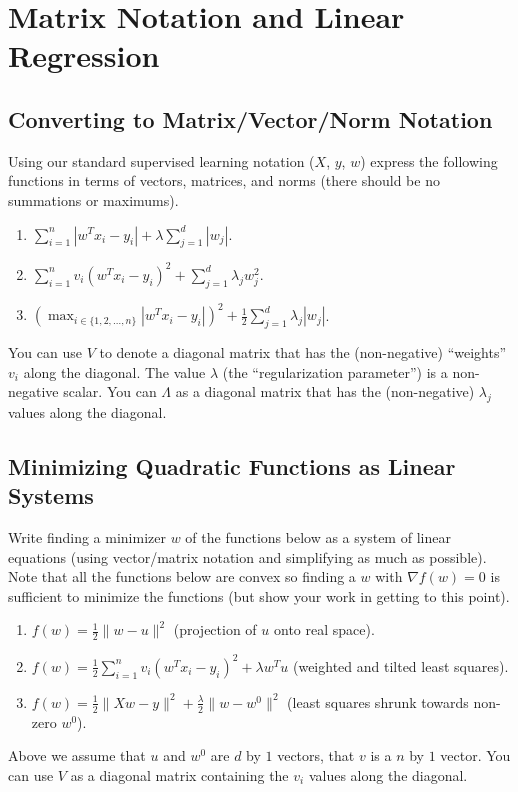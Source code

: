 \documentclass{article}
\def\blu#1{{\color{blu}#1}}
\def\norm#1{\|#1\|}
\def\half{\frac 1 2}
\def\enum#1{\begin{enumerate}#1\end{enumerate}}
\begin{document}
\section{Matrix Notation and Linear Regression}

\subsection{Converting to Matrix/Vector/Norm Notation}

Using our standard supervised learning notation ($X$, $y$, $w$)
express the following functions in terms of vectors, matrices, and norms (there should be no summations or maximums).
\blu{\enum{
\item $\sum_{i=1}^n  |w^Tx_i - y_i| + \lambda \sum_{j=1}^{d} |w_j|$.
\item $\sum_{i=1}^n v_i (w^Tx_i - y_i)^2 + \sum_{j=1}^{d} \lambda_j w_j^2$.
\item $\left(\max_{i \in \{1,2,\dots,n\}} |w^Tx_i - y_i|\right)^2 +  \half\sum_{j=1}^{d} \lambda_j|w_j|$.
}}
You can use $V$ to denote a diagonal matrix that has the (non-negative) ``weights'' $v_i$ along the diagonal. The value $\lambda$ (the ``regularization parameter'') is a non-negative scalar. You can $\Lambda$ as a diagonal matrix that has the (non-negative) $\lambda_j$ values along the diagonal.


\pagebreak

\subsection{Minimizing Quadratic Functions as Linear Systems}

Write finding a minimizer $w$ of the functions below as a system of linear equations (using vector/matrix notation and simplifying as much as possible). Note that all the functions below are convex  so finding a $w$ with $\nabla f(w) = 0$ is sufficient to minimize the functions (but show your work in getting to this point).

\blu{\enum{
\item $f(w) = \frac{1}{2}\norm{w-u}^2$ (projection of $u$ onto real space).
\item $f(w)= \frac{1}{2}\sum_{i=1}^n v_i (w^Tx_i - y_i)^2 + \lambda w^Tu$ (weighted and tilted least squares).
\item $f(w) = \frac{1}{2}\norm{Xw - y}^2 + \frac{\lambda}{2}\norm{w-w^0}^2$ (least squares shrunk towards non-zero $w^0$).
}}
Above we assume that $u$ and $w^0$ are $d$ by $1$ vectors, that $v$ is a $n$ by $1$ vector. You can use $V$ as a diagonal matrix containing the $v_i$ values along the diagonal.
\end{document}
